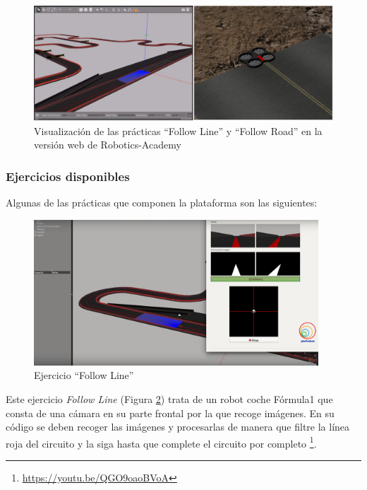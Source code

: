 \begin{figure}[H]
  \begin{center}
    \includegraphics[width=0.9\linewidth]{figures/gazeboworlds.png}
		\caption{Visualización de las prácticas ``Follow Line'' y ``Follow Road'' en la versión web de Robotics-Academy}
		\label{fig.academyweb}
		\end{center}
\end{figure}

\subsubsection{Ejercicios disponibles}
Algunas de las prácticas que componen la plataforma son las siguientes:

\begin{figure}[H]
  \begin{center}
    \includegraphics[width=0.95\textwidth]{figures/followline.png}
		\caption{Ejercicio ``Follow Line''}
		\label{fig.followline}
		\end{center}
\end{figure}

Este ejercicio \textit{Follow Line} (Figura \ref{fig.followline}) trata de un robot coche Fórmula1 que consta de una cámara en su parte frontal por la que recoge imágenes. En su código se deben recoger las imágenes y procesarlas de manera que filtre la línea roja del circuito y la siga hasta que complete el circuito por completo \footnote{\url{https://youtu.be/QGO9oaoBVoA}}.

